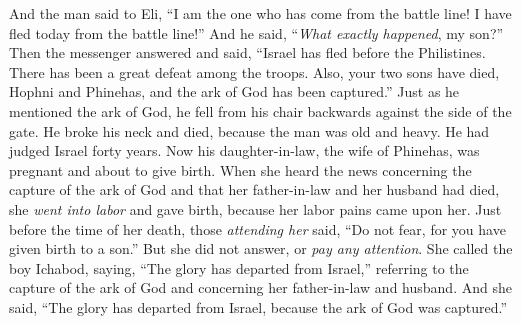 \begin{biblechapter}
\verse And the man said to Eli, “I am the one who has come from the battle line! I have fled today from the battle line!” And he said, “\textit{What exactly happened}, my son?”
\verse Then the messenger answered and said, “Israel has fled before the Philistines. There has been a great defeat among the troops. Also, your two sons have died, Hophni and Phinehas, and the ark of God has been captured.”
\verse Just as he mentioned the ark of God, he fell from his chair backwards against the side of the gate. He broke his neck and died, because the man was old and heavy. He had judged Israel forty years.
\verse Now his daughter-in-law, the wife of Phinehas, was pregnant and about to give birth. When she heard the news concerning the capture of the ark of God and that her father-in-law and her husband had died, she \textit{went into labor} and gave birth, because her labor pains came upon her.
\verse Just before the time of her death, those \textit{attending her} said, “Do not fear, for you have given birth to a son.” But she did not answer, or \textit{pay any attention}.
\verse She called the boy Ichabod, saying, “The glory has departed from Israel,” referring to the capture of the ark of God and concerning her father-in-law and husband.
\verse And she said, “The glory has departed from Israel, because the ark of God was captured.”
\end{biblechapter}

